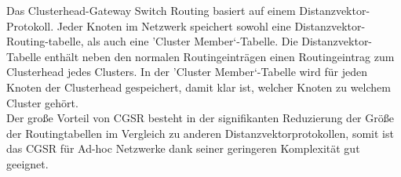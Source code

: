 Das Clusterhead-Gateway Switch Routing basiert auf einem Distanzvektor-Protokoll. Jeder Knoten im Netzwerk speichert sowohl eine Distanzvektor-Routing-tabelle, als auch eine 'Cluster Member‘-Tabelle. Die Distanzvektor-Tabelle enthält neben den normalen Routingeinträgen einen Routingeintrag zum Clusterhead jedes Clusters. In der 'Cluster Member‘-Tabelle wird für jeden Knoten der Clusterhead gespeichert, damit klar ist, welcher Knoten zu welchem Cluster gehört. \\

Der große Vorteil von CGSR besteht in der signifikanten Reduzierung der Größe der Routingtabellen im Vergleich zu anderen Distanzvektorprotokollen, somit ist das CGSR für Ad-hoc Netzwerke dank seiner geringeren Komplexität gut geeignet.

